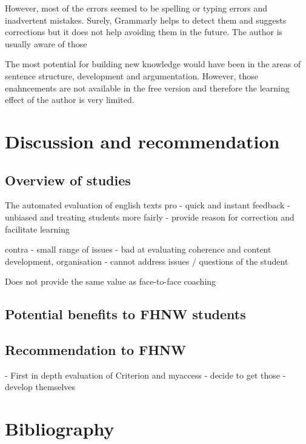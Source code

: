 \documentclass[runningheads]{llncs}
\let\OldTextregistered\textregistered
\renewcommand{\textregistered}{\OldTextregistered\xspace}%
\begin{document}
However, most of the errors seemed to be spelling or typing errors and inadvertent mistakes. Surely, Grammarly\textregistered helps to detect them and suggests corrections but it does not help avoiding them in the future. The author is usually aware of those 

The most potential for building new knowledge would have been in the areas of sentence structure, development and argumentation. However, those enahncements are not available in the free version and therefore the learning effect of the author is very limited.

\section{Discussion and recommendation}
\subsection{Overview of studies}
The automated evaluation of english texts 
pro
- quick and instant feedback
- unbiased and treating students more fairly
- provide reason for correction and facilitate learning

contra
- small range of issues 
- bad at evaluating coherence and content development, organisation
- cannot address issues / questions of the student

Does not provide the same value as face-to-face coaching 


\subsection{Potential benefits to FHNW students}

\subsection{Recommendation to FHNW}
- First in depth evaluation of Criterion and myaccess 
- decide to get those
- develop themselves

\section{Bibliography}


\printbibliography
\end{document}
